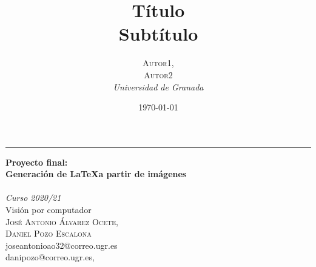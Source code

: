 \documentclass[a4paper, 20pt, dvipsnames]{article}
\title{\textbf{Título}\\ %
Subtítulo} %
\author{\textsc{Autor1,\\Autor2} %
\\{\textit{Universidad de Granada}}} %
\date{\today} %
\begin{document}

\begin{titlepage} %
	
	\raggedleft %
	
	\rule{1pt}{\textheight} %
	\hspace{0.05\textwidth} %
	\parbox[b]{0.8\textwidth}{ %
		
		{\Huge\bfseries Proyecto final:\\[0.5\baselineskip] Generación
                  de \LaTeX a partir de imágenes
                  \\[0.5\baselineskip]\\[2\baselineskip]} %
		{\large\textit{Curso 2020/21}\\[0.5\baselineskip]Visión por computador\\[1.5\baselineskip] }%
		{\Large\textsc{José Antonio Álvarez Ocete, \\Daniel Pozo Escalona}\\[1.5\baselineskip]joseantonioao32@correo.ugr.es\\danipozo@correo.ugr.es,} %
		
		\vspace{0.4\textheight} %
		
		{\noindent \\[0.5\baselineskip] }\\[\baselineskip] %
	}

\end{titlepage}


\end{document}

